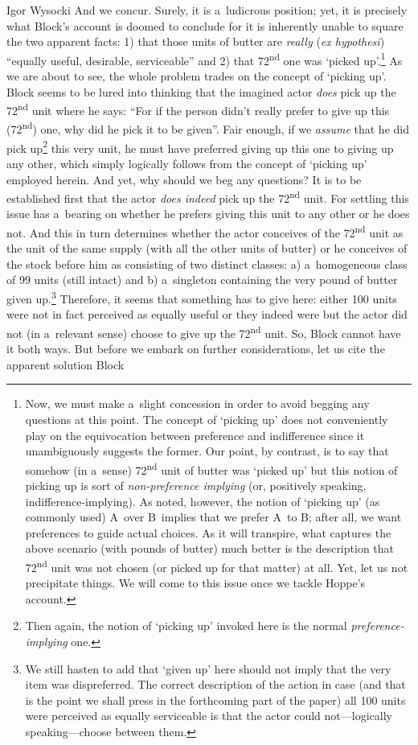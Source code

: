 \begin{artengenv}{Igor Wysocki}
And we concur. Surely, it is a~ludicrous position; yet, it is precisely what Block's account is doomed to conclude for it is inherently unable to square the two apparent facts: 1) that those units of butter are \textit{really} (\textit{ex hypothesi}) ``equally useful, desirable, serviceable'' and 2) that 72\textsuperscript{nd} one was ‘picked up'.\footnote{Now, we must make a~slight concession in order to avoid begging any questions at this point. The concept of ‘picking up' does not conveniently play on the equivocation between preference and indifference since it unambiguously suggests the former. Our point, by contrast, is to say that somehow (in a~sense) 72\textsuperscript{nd} unit of butter was ‘picked up' but this notion of picking up is sort of \textit{non-preference implying} (or, positively speaking, indifference-implying). As noted, however, the notion of ‘picking up' (as commonly used) A~over B~implies that we prefer A~to B; after all, we want preferences to guide actual choices. As it will transpire, what captures the above scenario (with pounds of butter) much better is the description that 72\textsuperscript{nd} unit was not chosen (or picked up for that matter) at all. Yet, let us not precipitate things. We will come to this issue once we tackle Hoppe's account.} As we are about to see, the whole problem trades on the concept of ‘picking up'. Block seems to be lured into thinking that the imagined actor \textit{does} pick up the 72\textsuperscript{nd} unit where he says: ``For if the person didn't really prefer to give up this (72\textsuperscript{nd}) one, why did he pick it to be given''. Fair enough, if we \textit{assume} that he did pick up\footnote{Then again, the notion of ‘picking up' invoked here is the normal \textit{preference-implying} one.} this very unit, he must have preferred giving up this one to giving up any other, which simply logically follows from the concept of ‘picking up' employed herein. And yet, why should we beg any questions? It is to be established first that the actor \textit{does indeed} pick up the 72\textsuperscript{nd} unit. For settling this issue has a~bearing on whether he prefers giving this unit to any other or he does not. And this in turn determines whether the actor conceives of the 72\textsuperscript{nd} unit as the unit of the same supply (with all the other units of butter) or he conceives of the stock before him as consisting of two distinct classes: a) a~homogeneous class of 99 units (still intact) and b) a~singleton containing the very pound of butter given up.\footnote{We still hasten to add that ‘given up' here should not imply that the very item was dispreferred. The correct description of the action in case (and that is the point we shall press in the forthcoming part of the paper) all 100 units were perceived as equally serviceable is that the actor could not---logically speaking---choose between them.} Therefore, it seems that something has to give here: either 100 units were not in fact perceived as equally useful or they indeed were but the actor did not (in a~relevant sense) choose to give up the 72\textsuperscript{nd} unit. So, Block cannot have it both ways. But before we embark on further considerations, let us cite the apparent solution Block

\end{artengenv}
